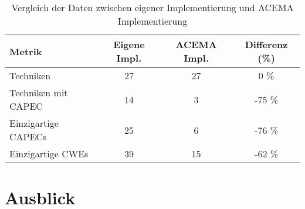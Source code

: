 \begin{table}[H]
    \centering
    \caption{Vergleich der Daten zwischen eigener Implementierung und ACEMA Implementierung}
    \begin{tabular}{|l|c|c|c|}
        \hline
        \textbf{Metrik}     & \textbf{Eigene Impl.} & \textbf{ACEMA Impl.} & \textbf{Differenz (\%)} \\
        \hline
        Techniken           & 27                    & 27                   & 0 \%                    \\
        \hline
        Techniken mit CAPEC & 14                    & 3                    & -75 \%                  \\
        \hline
        Einzigartige CAPECs & 25                    & 6                    & -76 \%                  \\
        \hline
        Einzigartige CWEs   & 39                    & 15                   & -62 \%                  \\
        \hline
    \end{tabular}
    \label{tab:comparison_with_diff}
\end{table}

\section{Ausblick}
\label{sec:ausblick}

